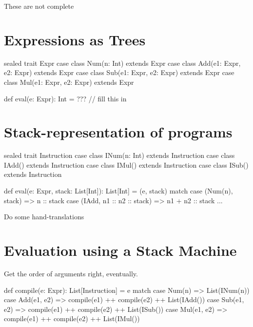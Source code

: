 \documentclass{book}
\begin{document}


\newlecture

\begin{instructor}
These are not complete
\end{instructor}

\section{Expressions as Trees}

\begin{scalacode}
sealed trait Expr
case class Num(n: Int) extends Expr
case class Add(e1: Expr, e2: Expr) extends Expr
case class Sub(e1: Expr, e2: Expr) extends Expr
case class Mul(e1: Expr, e2: Expr) extends Expr

def eval(e: Expr): Int = ??? // fill this in
\end{scalacode}

\section{Stack-representation of programs}

\begin{scalacode}
sealed trait Instruction
case class INum(n: Int) extends Instruction
case class IAdd() extends Instruction
case class IMul() extends Instruction
case class ISub() extends Instruction

def eval(e: Expr, stack: List[Int]): List[Int] = (e, stack) match {
  case (Num(n), stack) => n :: stack
  case (IAdd, n1 :: n2 :: stack) => n1 + n2 :: stack
  ...
}
\end{scalacode}

Do some hand-translations

\section{Evaluation using a Stack Machine}

Get the order of arguments right, eventually.

\begin{scalacode}
def compile(e: Expr): List[Instruction] = e match {
  case Num(n) => List(INum(n))
  case Add(e1, e2) => compile(e1) ++ compile(e2) ++ List(IAdd())
  case Sub(e1, e2) => compile(e1) ++ compile(e2) ++ List(ISub())
  case Mul(e1, e2) => compile(e1) ++ compile(e2) ++ List(IMul())
}

\end{scalacode}
\end{document}
